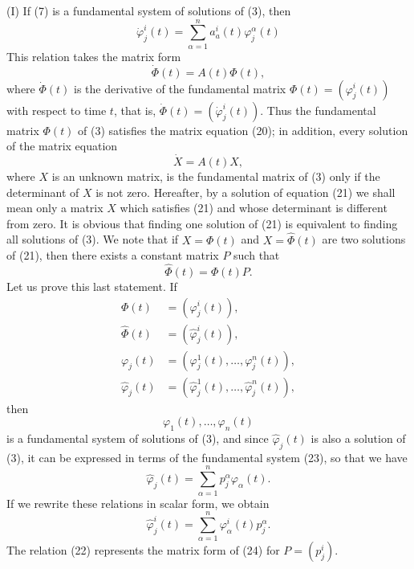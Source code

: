 \documentclass[10pt,a5paper]{book}
\theoremstyle{plain}
\theoremstyle{definition}
\theoremstyle{remark}
\begin{document}
(I) If (7) is a fundamental system of solutions of (3), then
\[
\dot{\varphi}_{j}^{i}(t)=\sum_{\alpha=1}^{n} a_{a}^{i}(t) \varphi_{j}^{\alpha}(t)
\]
This relation takes the matrix form
\begin{equation*}
\dot{\Phi}(t)=A(t) \Phi(t), \tag{20}
\end{equation*}
where $\dot{\Phi}(t)$ is the derivative of the fundamental matrix $\Phi(t)=\left(\varphi_{j}^{i}(t)\right)$ with respect to time $t$, that is, $\dot{\Phi}(t)=\left(\dot{\varphi}_{j}^{i}(t)\right)$. Thus the fundamental matrix $\Phi(t)$ of (3) satisfies the matrix equation (20); in addition, every solution of the matrix equation
\begin{equation*}
\dot{X}=A(t) X, \tag{21}
\end{equation*}
where $X$ is an unknown matrix, is the fundamental matrix of (3) only if the determinant of $X$ is not zero. Hereafter, by a solution of equation (21) we shall mean only a matrix $X$ which satisfies (21) and whose determinant is different from zero. It is obvious that finding one solution of (21) is equivalent to finding all solutions of (3). We note that if $X=\Phi(t)$ and $X=\hat{\Phi}(t)$ are two solutions of (21), then there exists a constant matrix $P$ such that
\begin{equation*}
\hat{\Phi}(t)=\Phi(t) P . \tag{22}
\end{equation*}
Let us prove this last statement. If
\[
\begin{aligned}
\Phi(t) & =\left(\varphi_{j}^{i}(t)\right), \\
\hat{\Phi}(t) & =\left(\hat{\varphi}_{j}^{i}(t)\right), \\
\varphi_{j}(t) & =\left(\varphi_{j}^{1}(t), \ldots, \varphi_{j}^{n}(t)\right), \\
\hat{\varphi}_{j}(t) & =\left(\hat{\varphi}_{j}^{1}(t), \ldots, \hat{\varphi}_{j}^{n}(t)\right),
\end{aligned}
\]
then
\begin{equation*}
\varphi_{1}(t), \ldots, \varphi_{n}(t) \tag{23}
\end{equation*}
is a fundamental system of solutions of (3), and since $\hat{\varphi}_{j}(t)$ is also a solution of (3), it can be expressed in terms of the fundamental system (23), so that we have
\[
\hat{\varphi}_{j}(t)=\sum_{\alpha=1}^{n} p_{j}^{\alpha} \varphi_{\alpha}(t) .
\]
If we rewrite these relations in scalar form, we obtain
\begin{equation*}
\hat{\varphi}_{j}^{i}(t)=\sum_{\alpha=1}^{n} \varphi_{\alpha}^{i}(t) p_{j}^{\alpha} . \tag{24}
\end{equation*}
The relation (22) represents the matrix form of (24) for $P=\left(p_{j}^{i}\right)$.
\end{document}
